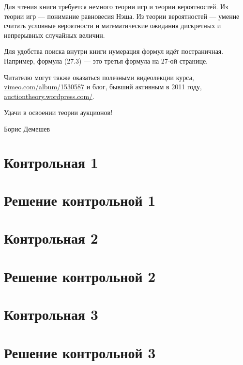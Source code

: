 \documentclass[11pt, openany]{book}
\numberwithin{equation}{page} %
\theoremstyle{definition} %
\theoremstyle{definition}
\theoremstyle{definition}
\begin{document}
Для чтения книги требуется немного теории игр и теории вероятностей. Из теории игр — понимание равновесия Нэша. Из теории вероятностей — умение считать условные вероятности и математические ожидания дискретных и непрерывных случайных величин.

Для удобства поиска внутри книги нумерация формул идёт постраничная. Например, формула (27.3) — это третья формула на 27-ой странице.

Читателю могут также оказаться полезными видеолекции курса, \url{vimeo.com/album/1530587} и блог, бывший активным в 2011 году, \url{auctiontheory.wordpress.com/}.

Удачи в освоении теории аукционов!

\begin{flushright}
  Борис Демешев
\end{flushright}




\section{Контрольная 1}



\section{Решение контрольной 1}






\section{Контрольная 2}



\section{Решение контрольной 2}





\section{Контрольная 3}



\section{Решение контрольной 3}
\end{document}
